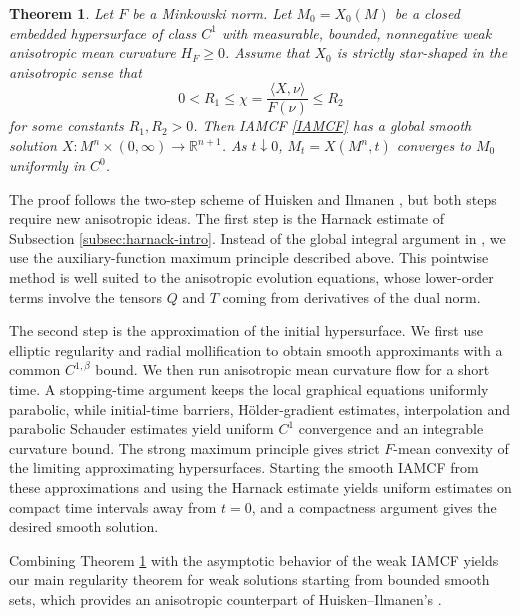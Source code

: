 \documentclass[11pt,reqno]{amsart}
\newtheorem{theorem}[proposition]{Theorem}
\theoremstyle{definition}
\theoremstyle{remark}
\numberwithin{equation}{section}
\begin{document}
	\begin{theorem}
	\label{higher-our}
		Let $F$ be a Minkowski norm. Let $M_0=X_0(M)$ be a closed embedded hypersurface of class $C^1$ with measurable, bounded, nonnegative weak anisotropic mean curvature $H_F\geq 0$. 
		Assume that $X_0$ is strictly star-shaped in the anisotropic sense that
		\begin{equation*}
			0<R_1\leq \chi=\frac{\langle X,\nu\rangle}{F(\nu)}\leq R_2
		\end{equation*}
		for some constants $R_1,R_2>0$. Then IAMCF \eqref{IAMCF} has a global smooth solution $X:M^n\times(0,\infty)\to\mathbb{R}^{n+1}$. As $t\downarrow 0$, $M_t=X(M^n,t)$ converges to $M_0$ uniformly in $C^0$.
	\end{theorem}
	
	The proof follows the two-step scheme of Huisken and Ilmanen \cite{HI08}, but both steps require new anisotropic ideas. The first step is the Harnack estimate of Subsection \ref{subsec:harnack-intro}. Instead of the global integral argument in \cite{HI08}, we use the auxiliary-function maximum principle described above. This pointwise method is well suited to the anisotropic evolution equations, whose lower-order terms involve the tensors $Q$ and $T$ coming from derivatives of the dual norm.
	
	The second step is the approximation of the initial hypersurface. We first use elliptic regularity and radial mollification to obtain smooth approximants with a common $C^{1,\beta}$ bound. We then run anisotropic mean curvature flow for a short time. A stopping-time argument keeps the local graphical equations uniformly parabolic, while initial-time barriers, H\"older-gradient estimates, interpolation and parabolic Schauder estimates yield uniform $C^1$ convergence and an integrable curvature bound. The strong maximum principle gives strict $F$-mean convexity of the limiting approximating hypersurfaces. Starting the smooth IAMCF from these approximations and using the Harnack estimate yields uniform estimates on compact time intervals away from $t=0$, and a compactness argument gives the desired smooth solution.
	
	Combining Theorem \ref{higher-our} with the asymptotic behavior of the weak IAMCF yields our main regularity theorem for weak solutions starting from bounded smooth sets, which provides an anisotropic counterpart of Huisken--Ilmanen's \cite[Theorem 2.7]{HI08}.
	
\end{document}
